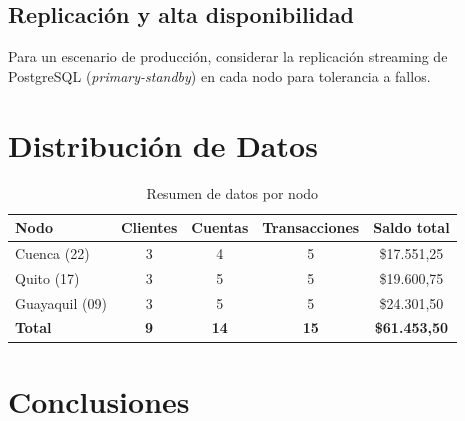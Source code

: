 \documentclass[12pt, a4paper]{article}
\begin{document}
\subsection{Replicación y alta disponibilidad}
Para un escenario de producción, considerar la replicación streaming de PostgreSQL (\textit{primary-standby}) en cada nodo para tolerancia a fallos.

\section{Distribución de Datos}

\begin{table}[H]
\centering
\caption{Resumen de datos por nodo}
\begin{tabular}{@{} l c c c c @{}}
\toprule
\textbf{Nodo} & \textbf{Clientes} & \textbf{Cuentas} & \textbf{Transacciones} & \textbf{Saldo total} \\
\midrule
Cuenca (22) & 3 & 4 & 5 & \$17.551,25 \\
Quito (17) & 3 & 5 & 5 & \$19.600,75 \\
Guayaquil (09) & 3 & 5 & 5 & \$24.301,50 \\
\midrule
\textbf{Total} & \textbf{9} & \textbf{14} & \textbf{15} & \textbf{\$61.453,50} \\
\bottomrule
\end{tabular}
\end{table}

\section{Conclusiones}
\end{document}
